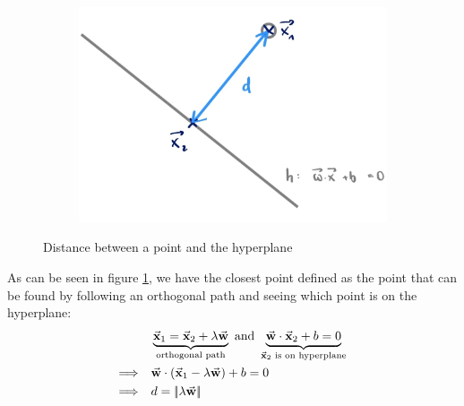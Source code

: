 \begin{figure}[H]
  \centering
  \begin{subfigure}{0.4\textwidth}
    \centering
    \includegraphics[width=1\textwidth]{assets/svm/b__distance.png} 
  \end{subfigure}\hspace*{0.05\textwidth}
  \begin{subfigure}{0.5\textwidth}

  \end{subfigure}
  \caption{Distance between a point and the hyperplane}
  \label{fig:5_distance_to_h}
\end{figure}

As can be seen in figure \ref{fig:5_distance_to_h}, we have the closest point defined as the point that can be found by following an orthogonal path and seeing which point is on the hyperplane:
\begin{align*}\begin{aligned}
  &\underbrace{\vec{\mathbf{x}}_1 = \vec{\mathbf{x}}_2 + \lambda \vec{\mathbf{w}}}_{\textnormal{\color{black}{orthogonal path}}} \textnormal{\color{black}{ and }} \underbrace{\vec{\mathbf{w}}\cdot\vec{\mathbf{x}}_2 + b = 0}_{\vec{\mathbf{x}}_2\textnormal{\color{black}{ is on hyperplane}}}\\
  \Longrightarrow\quad & \vec{\mathbf{w}}\cdot(\vec{\mathbf{x}}_1 - \lambda \vec{\mathbf{w}}) + b = 0\\
  \Longrightarrow\quad & d = |\!|  \lambda \vec{\mathbf{w}}  |\!|
\end{aligned}\end{align*}

